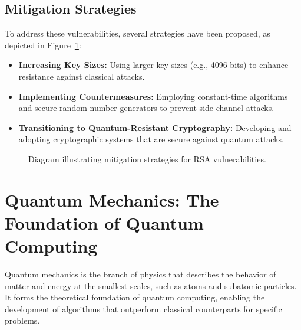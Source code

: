\documentclass[12pt,a4paper]{report}
\begin{document}
\section{Mitigation Strategies}
To address these vulnerabilities, several strategies have been proposed, as depicted in Figure~\ref{fig:mitigation_strategies}:
\begin{itemize}
    \item \textbf{Increasing Key Sizes:} Using larger key sizes (e.g., 4096 bits) to enhance resistance against classical attacks.
    \item \textbf{Implementing Countermeasures:} Employing constant-time algorithms and secure random number generators to prevent side-channel attacks.
    \item \textbf{Transitioning to Quantum-Resistant Cryptography:} Developing and adopting cryptographic systems that are secure against quantum attacks.
\end{itemize}

\begin{figure}[h!]
    \centering
    \caption{Diagram illustrating mitigation strategies for RSA vulnerabilities.}\label{fig:mitigation_strategies}
\end{figure}


\chapter{Quantum Mechanics: The Foundation of Quantum Computing}
Quantum mechanics is the branch of physics that describes the behavior of matter and energy at the smallest scales, such as atoms and subatomic particles. It forms the theoretical foundation of quantum computing, enabling the development of algorithms that outperform classical counterparts for specific problems.
\end{document}

